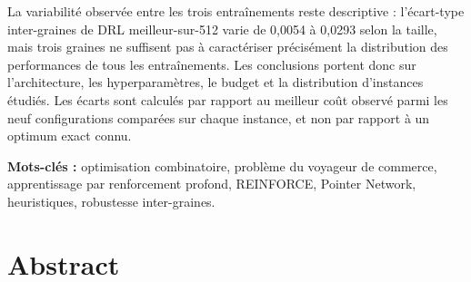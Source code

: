 \documentclass[12pt, a4paper, twoside, openright]{book}
\begin{document}
\begin{tcolorbox}[
enhanced,
colback=ThBlue!5,
colframe=ThBlue,
boxsep=2mm,
left=2mm,
right=2mm,
top=1mm,
bottom=1mm,
fontupper=\small,
]
La variabilité observée entre les trois entraînements reste descriptive :
l'écart-type inter-graines de DRL meilleur-sur-512 varie de 0,0054 à
0,0293 selon la taille, mais trois graines ne suffisent pas à caractériser
précisément la distribution des performances de tous les entraînements.
Les conclusions portent donc sur l'architecture, les hyperparamètres,
le budget et la distribution d'instances étudiés. Les écarts sont calculés
par rapport au meilleur coût observé parmi les neuf configurations
comparées sur chaque instance, et non par rapport à un optimum exact connu.

\medskip
\textbf{Mots-cl\'es :} optimisation combinatoire, problème du voyageur
de commerce, apprentissage par renforcement profond, REINFORCE,
Pointer Network, heuristiques, robustesse inter-graines.
\end{tcolorbox}


\clearpage
\chapter*{Abstract}
\end{document}
